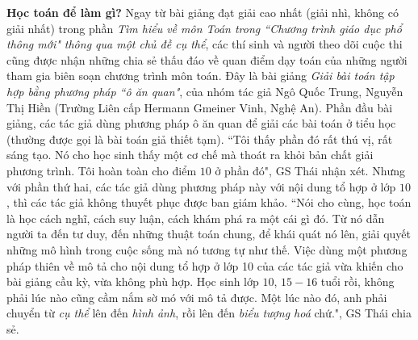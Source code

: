 \begin{multicols}{2}
	\vskip 0.1cm
	\textbf{\color{diendantoanhoc}Học toán để làm gì?} 
	\vskip 0.1cm
	Ngay từ bài giảng đạt giải cao nhất (giải nhì, không có giải nhất) trong phần \textit{Tìm hiểu về môn Toán trong ``Chương trình giáo dục phổ thông mới" thông qua một chủ đề cụ thể}, các thí sinh và người theo dõi cuộc thi cũng được nhận những chia sẻ thấu đáo về quan điểm dạy toán của những người tham gia biên soạn chương trình môn toán. Đây là bài giảng \textit{Giải bài toán tập hợp bằng phương pháp ``ô ăn quan"}, của nhóm tác giả Ngô Quốc Trung, Nguyễn Thị Hiền (Trường Liên cấp Hermann Gmeiner Vinh, Nghệ An). Phần đầu bài giảng, các tác giả dùng phương pháp ô ăn quan để giải các bài toán ở tiểu học (thường được gọi là bài toán giả thiết tạm). ``Tôi thấy phần đó rất thú vị, rất sáng tạo. Nó cho học sinh thấy một cơ chế mà thoát ra khỏi bản chất giải phương trình. Tôi hoàn toàn cho điểm $10$ ở phần đó", GS Thái nhận xét.
	\vskip 0.1cm
	Nhưng với phần thứ hai, các tác giả dùng phương pháp này với nội dung tổ hợp ở lớp $10$, thì các tác giả không thuyết phục được ban giám khảo. ``Nói cho cùng, học toán là học cách nghĩ, cách suy luận, cách khám phá ra một cái gì đó. Từ nó dẫn người ta đến tư duy, đến những thuật toán chung, để khái quát nó lên, giải quyết những mô hình trong cuộc sống mà nó tương tự như thế. Việc dùng một phương pháp thiên về mô tả cho nội dung tổ hợp ở lớp 10 của các tác giả vừa khiến cho bài giảng cầu kỳ, vừa không phù hợp.  Học sinh lớp $10$, $15-16$ tuổi rồi, không phải lúc nào cũng cầm nắm sờ mó với mô tả được. Một lúc nào đó, anh phải chuyển từ \textit{cụ thể} lên đến \textit{hình ảnh}, rồi lên đến \textit{biểu tượng hoá} chứ.",  GS Thái chia sẻ.
	\vskip 0.1cm
	

\end{multicols}
